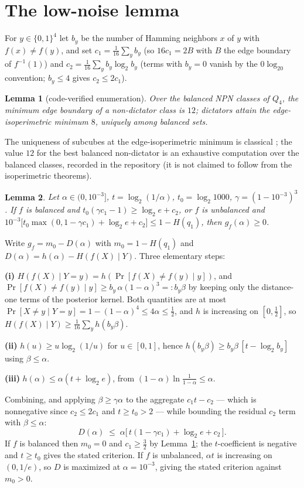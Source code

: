 \documentclass[12pt,draftclsnofoot,onecolumn,journal]{IEEEtran}
\newtheorem{lemma}{Lemma}
\begin{document}
\section{The low-noise lemma}

For $y\in\{0,1\}^4$ let $b_y$ be the number of Hamming neighbors $x$ of $y$
with $f(x)\neq f(y)$, and set $c_1=\tfrac1{16}\sum_y b_y$ (so $16c_1=2B$ with
$B$ the edge boundary of $f^{-1}(1)$) and
$c_2=\tfrac1{16}\sum_y b_y\log_2 b_y$ (terms with $b_y=0$ vanish by the
$0\log_20$ convention; $b_y\le4$ gives $c_2\le2c_1$).

\begin{lemma}[code-verified enumeration]\label{lem:boundary}
Over the balanced NPN classes of $Q_4$, the minimum edge boundary of a
non-dictator class is $12$; dictators attain the edge-isoperimetric minimum
$8$, uniquely among balanced sets.
\end{lemma}

The uniqueness of subcubes at the edge-isoperimetric minimum is classical
\cite{Lindsey64,Harper64,Bernstein67,Hart76}; the value $12$ for the best
balanced non-dictator is an exhaustive computation over the balanced classes,
recorded in the repository (it is not claimed to follow from the
isoperimetric theorems).

\begin{lemma}\label{lem:low}
Let $\alpha\in(0,10^{-3}]$, $t=\log_2(1/\alpha)$, $t_0=\log_2 1000$,
$\gamma=(1-10^{-3})^3$. If $f$ is balanced and
$t_0(\gamma c_1-1)\ge \log_2 e+c_2$, or $f$ is unbalanced and
$10^{-3}\bigl[t_0\max(0,1-\gamma c_1)+\log_2 e+c_2\bigr]\le 1-H(q_1)$,
then $g_f(\alpha)\ge 0$.
\end{lemma}

\begin{IEEEproof}
Write $g_f=m_0-D(\alpha)$ with $m_0=1-H(q_1)$ and
$D(\alpha)=h(\alpha)-H(f(X)\mid Y)$. Three elementary steps:

\textbf{(i)} $H(f(X)\mid Y{=}y)=h(\Pr[f(X)\neq f(y)\mid y])$, and
$\Pr[f(X)\neq f(y)\mid y]\ge b_y\,\alpha(1-\alpha)^3=:b_y\beta$ by keeping
only the distance-one terms of the posterior kernel. Both quantities are at
most $\Pr[X\ne y\mid Y{=}y]=1-(1-\alpha)^4\le4\alpha\le\tfrac12$, and $h$ is
increasing on $[0,\tfrac12]$, so
$H(f(X)\mid Y)\ge\tfrac1{16}\sum_y h(b_y\beta)$.

\textbf{(ii)} $h(u)\ge u\log_2(1/u)$ for $u\in[0,1]$, hence
$h(b_y\beta)\ge b_y\beta\,[t-\log_2 b_y]$ using $\beta\le\alpha$.

\textbf{(iii)} $h(\alpha)\le\alpha(t+\log_2 e)$, from
$(1-\alpha)\ln\frac1{1-\alpha}\le\alpha$.

Combining, and applying $\beta\ge\gamma\alpha$ to the aggregate
$c_1t-c_2$ --- which is nonnegative since $c_2\le2c_1$ and $t\ge t_0>2$ ---
while bounding the residual $c_2$ term with $\beta\le\alpha$:
\[
D(\alpha)\;\le\;\alpha\bigl[\,t(1-\gamma c_1)+\log_2 e+c_2\,\bigr].
\]
If $f$ is balanced then $m_0=0$ and $c_1\ge\tfrac32$ by
Lemma~\ref{lem:boundary}; the $t$-coefficient is negative and $t\ge t_0$
gives the stated criterion. If $f$ is unbalanced, $\alpha t$ is increasing on
$(0,1/e)$, so $D$ is maximized at $\alpha=10^{-3}$, giving the stated
criterion against $m_0>0$.
\end{IEEEproof}
\end{document}

